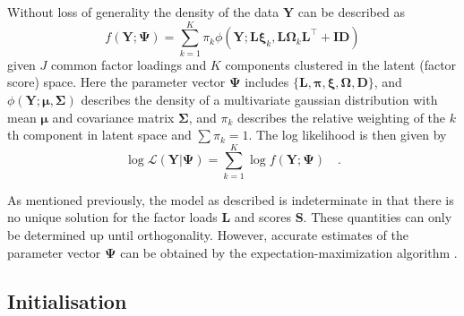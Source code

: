 \documentclass[twocolumn]{aastex61}
\newcommand{\vect}[1]{\boldsymbol{\mathbf{#1}}}
\renewcommand{\vec}[1]{\vect{#1}}
\newcommand{\weight}{\pi}
\newcommand{\data}{\textbf{Y}}
\newcommand{\vecdata}{\vec\data}
\newcommand{\transpose}{^\intercal}
\newcommand{\eye}{\textbf{I}}
\newcommand{\factorloads}{\textbf{L}}
\newcommand{\factorscores}{\textbf{S}}
\newcommand{\specificvariance}{\vec{D}}
\newcommand{\scoremeans}{\vec\xi}
\newcommand{\scorecovs}{\vec\Omega}
\newcommand{\NumLatentFactors}{J}
\newcommand{\NumComponents}{K}
\newcommand{\numcomponents}{k}
\begin{document}
Without loss of generality the density of the data $\vecdata$ can be described as
\begin{equation}
	f(\vecdata; \vec\Psi) = \sum_{\numcomponents=1}^{\NumComponents}\weight_\numcomponents\phi(\vecdata;\factorloads\scoremeans_\numcomponents, \factorloads\scorecovs_\numcomponents\factorloads\transpose + \eye\specificvariance)
\end{equation}
\noindent{}given $\NumLatentFactors$ common factor loadings and $\NumComponents$ components
clustered in the latent (factor score) space. Here the parameter
vector
$\vec\Psi$ includes $\{\factorloads,\vec\pi,\scoremeans,\scorecovs,\specificvariance\}$, and $\phi(\vecdata;\vec\mu, \vec\Sigma)$
describes the density of a multivariate gaussian distribution with
mean $\vec\mu$ and covariance matrix $\vec\Sigma$,
and $\weight_\numcomponents$ describes the relative weighting of the $\numcomponents$th
component in latent space and $\sum\weight_\numcomponents = 1$.
The log likelihood is then given by
\begin{equation}
	\log\mathcal{L}(\vecdata|\vec\Psi) = \sum_{\numcomponents=1}^{\NumComponents}\log{f(\vecdata;\vec\Psi)} \quad .
\end{equation}


As mentioned previously, the model as described is indeterminate in that
there is no unique solution for the factor loads $\factorloads$ and scores
$\factorscores$. These quantities can only be determined up until 
orthogonality. However, accurate estimates of the parameter vector $\vec\Psi$
can be obtained by the expectation-maximization algorithm \citep{Dempster:1977}.



\subsection{Initialisation}
\end{document}

